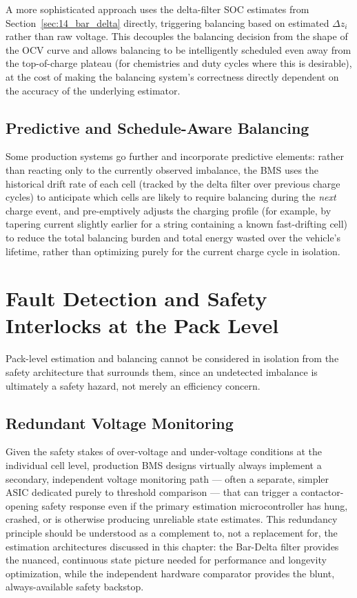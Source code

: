 A more sophisticated approach uses the delta-filter SOC estimates from Section~\ref{sec:14_bar_delta} directly, triggering balancing based on estimated $\Delta z_i$ rather than raw voltage. This decouples the balancing decision from the shape of the OCV curve and allows balancing to be intelligently scheduled even away from the top-of-charge plateau (for chemistries and duty cycles where this is desirable), at the cost of making the balancing system's correctness directly dependent on the accuracy of the underlying estimator.

\subsection{Predictive and Schedule-Aware Balancing}
\label{subsec:14_predictive_balancing}

Some production systems go further and incorporate predictive elements: rather than reacting only to the currently observed imbalance, the BMS uses the historical drift rate of each cell (tracked by the delta filter over previous charge cycles) to anticipate which cells are likely to require balancing during the \emph{next} charge event, and pre-emptively adjusts the charging profile (for example, by tapering current slightly earlier for a string containing a known fast-drifting cell) to reduce the total balancing burden and total energy wasted over the vehicle's lifetime, rather than optimizing purely for the current charge cycle in isolation.

\section{Fault Detection and Safety Interlocks at the Pack Level}
\label{sec:14_fault_detection}

Pack-level estimation and balancing cannot be considered in isolation from the safety architecture that surrounds them, since an undetected imbalance is ultimately a safety hazard, not merely an efficiency concern.

\subsection{Redundant Voltage Monitoring}
\label{subsec:14_redundant_monitoring}

Given the safety stakes of over-voltage and under-voltage conditions at the individual cell level, production BMS designs virtually always implement a secondary, independent voltage monitoring path — often a separate, simpler ASIC dedicated purely to threshold comparison — that can trigger a contactor-opening safety response even if the primary estimation microcontroller has hung, crashed, or is otherwise producing unreliable state estimates. This redundancy principle should be understood as a complement to, not a replacement for, the estimation architectures discussed in this chapter: the Bar-Delta filter provides the nuanced, continuous state picture needed for performance and longevity optimization, while the independent hardware comparator provides the blunt, always-available safety backstop.

